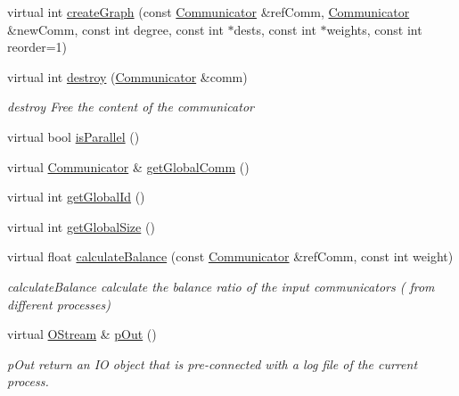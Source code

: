 \begin{DoxyCompactItemize}
\item 
virtual int \hyperlink{classHSF_1_1CommunicationManager_a6740c20953c04b2283a830b8f1226d9f}{createGraph} (const \hyperlink{classHSF_1_1Communicator}{Communicator} \&refComm, \hyperlink{classHSF_1_1Communicator}{Communicator} \&newComm, const int degree, const int $\ast$dests, const int $\ast$weights, const int reorder=1)
\item 
virtual int \hyperlink{classHSF_1_1CommunicationManager_ab1ce47822ae286b8e08be0a796f3feea}{destroy} (\hyperlink{classHSF_1_1Communicator}{Communicator} \&comm)
\begin{DoxyCompactList}\small\item\em destroy Free the content of the communicator \item\end{DoxyCompactList}\item 
virtual bool \hyperlink{classHSF_1_1CommunicationManager_a1a8ea32f81aa56766552980fa3825127}{isParallel} ()
\item 
virtual \hyperlink{classHSF_1_1Communicator}{Communicator} \& \hyperlink{classHSF_1_1CommunicationManager_ac71fa06c7568af39df109ffa32a5c444}{getGlobalComm} ()
\item 
virtual int \hyperlink{classHSF_1_1CommunicationManager_aaba8e09de5ff7ff523875e8d0a24c03e}{getGlobalId} ()
\item 
virtual int \hyperlink{classHSF_1_1CommunicationManager_aa6dbe644e35edc6dd37ddb16641077bf}{getGlobalSize} ()
\item 
virtual float \hyperlink{classHSF_1_1CommunicationManager_a7793e296e5d433a312894b1d59ddb0a5}{calculateBalance} (const \hyperlink{classHSF_1_1Communicator}{Communicator} \&refComm, const int weight)
\begin{DoxyCompactList}\small\item\em calculateBalance calculate the balance ratio of the input communicators ( from different processes) \item\end{DoxyCompactList}\item 
virtual \hyperlink{classHSF_1_1OStream}{OStream} \& \hyperlink{classHSF_1_1CommunicationManager_a90bf65f0e45df795cf861f829b82ac3d}{pOut} ()
\begin{DoxyCompactList}\small\item\em pOut return an IO object that is pre-\/connected with a log file of the current process. \item\end{DoxyCompactList}\item 

\end{DoxyCompactItemize}
